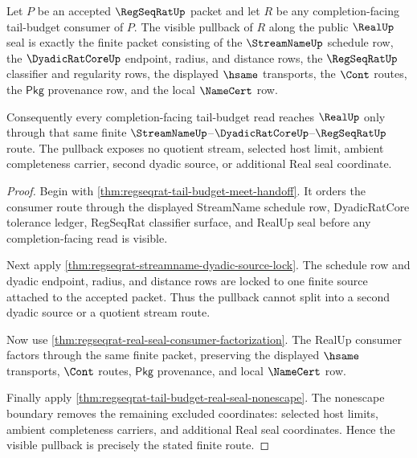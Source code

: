 \begin{theorem}
\label{thm:regseqrat-tail-budget-window-seal-pullback}
Let $P$ be an accepted $\RegSeqRatUp$ packet and let $R$ be any
completion-facing tail-budget consumer of $P$. The visible pullback of $R$
along the public $\RealUp$ seal is exactly the finite packet consisting of the
$\StreamNameUp$ schedule row, the $\DyadicRatCoreUp$ endpoint, radius, and
distance rows, the $\RegSeqRatUp$ classifier and regularity rows, the displayed
$\hsame$ transports, the $\Cont$ routes, the $\mathsf{Pkg}$ provenance row,
and the local $\NameCert$ row.

Consequently every completion-facing tail-budget read reaches $\RealUp$ only
through that same finite $\StreamNameUp$--$\DyadicRatCoreUp$--$\RegSeqRatUp$
route. The pullback exposes no quotient stream, selected host limit, ambient
completeness carrier, second dyadic source, or additional Real seal
coordinate.
\end{theorem}
\begin{proof}
Begin with \autoref{thm:regseqrat-tail-budget-meet-handoff}. It orders the
consumer route through the displayed StreamName schedule row, DyadicRatCore
tolerance ledger, RegSeqRat classifier surface, and RealUp seal before any
completion-facing read is visible.

Next apply \autoref{thm:regseqrat-streamname-dyadic-source-lock}. The schedule
row and dyadic endpoint, radius, and distance rows are locked to one finite
source attached to the accepted packet. Thus the pullback cannot split into a
second dyadic source or a quotient stream route.

Now use \autoref{thm:regseqrat-real-seal-consumer-factorization}. The RealUp
consumer factors through the same finite packet, preserving the displayed
$\hsame$ transports, $\Cont$ routes, $\mathsf{Pkg}$ provenance, and local
$\NameCert$ row.

Finally apply
\autoref{thm:regseqrat-tail-budget-real-seal-nonescape}. The nonescape
boundary removes the remaining excluded coordinates: selected host limits,
ambient completeness carriers, and additional Real seal coordinates. Hence the
visible pullback is precisely the stated finite route.
\end{proof}

